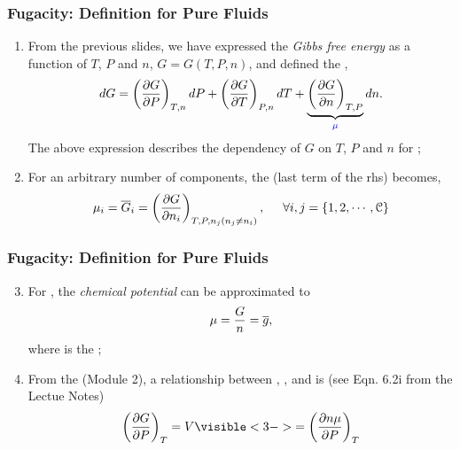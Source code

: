 \documentclass[10pt,compress,handout,ignorenonframetext,unknownkeysallowed]{beamer}
\begin{document}
\begin{frame}
  \frametitle{Fugacity: Definition for Pure Fluids}
        \begin{enumerate}%
           \item<1-> From the previous slides, we have expressed the {\it Gibbs free energy} as a function of $T$, $P$ and $n$, \ie $G=G(T,P,n)$, and defined the ,
              \begin{displaymath}
                dG = \Partial[G]{P}{T,n}dP + \Partial[G]{T}{P,n}dT + \underbrace{\Partial[G]{n}{T,P}}_{\blue{\mu}}dn.
              \end{displaymath}
              The above expression describes the dependency of $G$ on $T$, $P$ and $n$ for ;
           \item<2-> For an arbitrary number of components, the  (\ie last term of the rhs) becomes,
             \begin{displaymath}
               \mu_{i} = \overline{G}_{i}=\Partial[G]{n_{i}}{T,P,n_{j} \left(n_{j}\ne n_{i}\right)}, \hspace{0.5cm} \forall i,j=\left\{1,2,\cdots,\mathcal{C}\right\}
               \end{displaymath}
        \end{enumerate}
\end{frame}
\normalsize


\begin{frame}
  \frametitle{Fugacity: Definition for Pure Fluids}
        \begin{enumerate}\setcounter{enumi}{2}  
           \item<1-> For , the {\it chemical potential} can be approximated to
             \begin{displaymath}
               \mu = \frc{G}{n} = \overline{g},
             \end{displaymath}
             where  is the ;
             
           \item<2-> From the  (Module 2), a relationship between , ,  and  is (see Eqn. 6.2i from the Lectue Notes)
             \begin{displaymath}
                \Partial[G]{P}{T} = V \visible<3->{= \Partial[n\mu]{P}{T}}
             \end{displaymath}
               
        \end{enumerate}
\end{frame}
\normalsize
\end{document}
